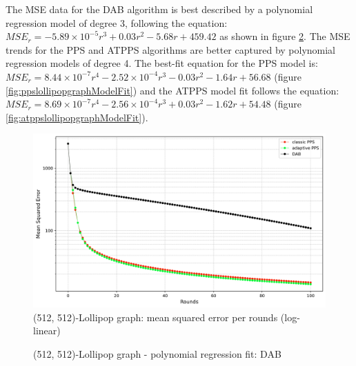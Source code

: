 The MSE data for the DAB algorithm is best described by a polynomial regression model of degree 3, following the equation: $MSE_r=-5.89\times10^{-5}r^{3}+0.03r^{2}-5.68r+459.42$ as shown in figure \ref{fig:dablollipopgraphModelFit}. The MSE trends for the PPS and ATPPS algorithms are better captured by polynomial regression models of degree 4. The best-fit equation for the PPS model is: $MSE_r=8.44\times 10^{-7}r^{4}-2.52\times 10^{-4}r^{3}-0.03r^{2}-1.64r+56.68$ (figure \ref{fig:ppslollipopgraphModelFit}) and the ATPPS model fit follows the equation: $MSE_r=8.69 \times 10^{-7}r^{4}-2.56 \times 10^{-4}r^{3}+0.03r^{2}-1.62r+54.48$ (figure \ref{fig:atppslollipopgraphModelFit}).

\begin{figure}[]
    \centering
    \includegraphics[width=\linewidth]{figures/Simulation_outcomes/LollipopGraph/512_512/DAB_vs_PPS_LG_r100_n1024_averaged_log.png}
    \caption{(512, 512)-Lollipop graph: mean squared error per rounds (log-linear)}
    \label{fig:lollipopgraphMSEperRoundLogLog}
\end{figure}

\begin{figure}[]
    \centering
    \caption{(512, 512)-Lollipop graph - polynomial regression fit: DAB}
    \label{fig:dablollipopgraphModelFit}
\end{figure}

